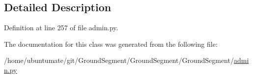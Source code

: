 \subsection{Detailed Description}


Definition at line 257 of file admin.\+py.



The documentation for this class was generated from the following file\+:\begin{DoxyCompactItemize}
\item 
/home/ubuntumate/git/\+Ground\+Segment/\+Ground\+Segment/\+Ground\+Segment/\hyperlink{admin_8py}{admin.\+py}\end{DoxyCompactItemize}
